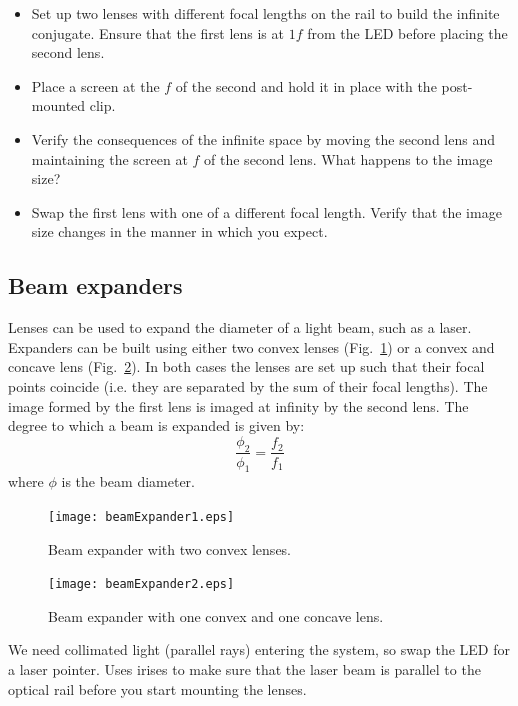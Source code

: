 \documentclass[a4paper]{report}
\newcommand{\nexercise}[0]{\arabic{exercises}\addtocounter{exercises}{1}}
\begin{document}
\begin{exercisebox}[frametitle={Exercise \nexercise: Infinite conjugate}]
\begin{itemize}
\item Set up two lenses with different focal lengths on the rail to build the infinite conjugate. 
Ensure that the first lens is at $1f$ from the LED before placing the second lens. 
\item Place a screen at the $f$ of the second and hold it in place with the post-mounted clip.
\item Verify the consequences of the infinite space by moving the second lens and maintaining the screen at $f$ of the second lens. 
What happens to the image size?
\item Swap the first lens with one of a different focal length. 
Verify that the image size changes in the manner in which you expect. 
\end{itemize}
\end{exercisebox}

\clearpage

\subsection{Beam expanders}
Lenses can be used to expand the diameter of a light beam, such as a laser.
Expanders can be built using either two convex lenses (Fig.~\ref{beamExpander1}) or a convex and concave lens (Fig.~\ref{beamExpander2}). 
In both cases the lenses are set up such that their focal points coincide (i.e. they are separated by the sum of their focal lengths). 
The image formed by the first lens is imaged at infinity by the second lens.
The degree to which a beam is expanded is given by:
\begin{equation}
\frac{\phi_2}{\phi_1}=\frac{f_2}{f_1}
\label{eq:beamExp}
\end{equation}
where $\phi$ is the beam diameter.

\begin{figure}[h]
\center
\texttt{[image: beamExpander1.eps]}
\caption{Beam expander with two convex lenses.}
\label{beamExpander1}
\end{figure}

\begin{figure}[h]
\center
\texttt{[image: beamExpander2.eps]}
\caption{Beam expander with one convex and one concave lens.}
\label{beamExpander2}
\end{figure}

We need collimated light (parallel rays) entering the system, so swap the LED for a laser pointer. Uses irises to make sure that the laser beam is parallel to the optical rail before you start mounting the lenses.
\end{document}

